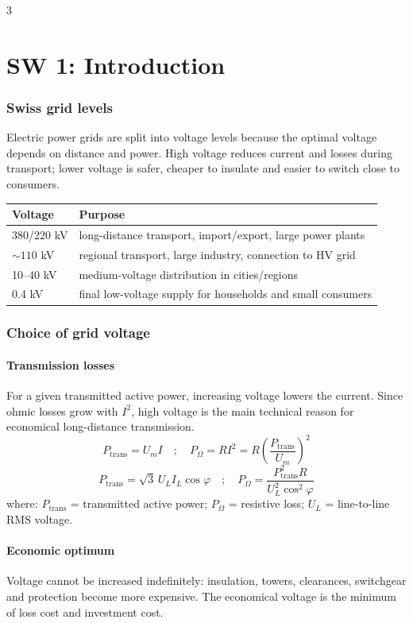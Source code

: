 \documentclass[9pt, landscape, a4paper]{article}
\begin{document}
\begin{multicols*}{3}
\part{SW 1: Introduction}
\section{Swiss grid levels}
Electric power grids are split into voltage levels because the optimal voltage
depends on distance and power. High voltage reduces current and losses during
transport; lower voltage is safer, cheaper to insulate and easier to switch
close to consumers.

\begin{tabularx}{\columnwidth}{@{}lX@{}}
  \toprule
  \textbf{Voltage} & \textbf{Purpose}\\
  \midrule
  380/220 kV & long-distance transport, import/export, large power plants\\
  $\sim110$ kV & regional transport, large industry, connection to HV grid\\
  10--40 kV & medium-voltage distribution in cities/regions\\
  0.4 kV & final low-voltage supply for households and small consumers\\
  \bottomrule
\end{tabularx}

\section{Choice of grid voltage}
\subsection{Transmission losses}
For a given transmitted active power, increasing voltage lowers the current.
Since ohmic losses grow with $I^2$, high voltage is the main technical reason
for economical long-distance transmission.
\[
  P_{\mathrm{trans}}=U_mI
  \quad ; \quad
  P_\Omega=RI^2
  =R\left(\frac{P_{\mathrm{trans}}}{U_m}\right)^2
\]
\[
  P_{\mathrm{trans}}=\sqrt{3}\,U_LI_L\cos\varphi
  \quad ; \quad
  P_\Omega=\frac{P_{\mathrm{trans}}^2R}
  {U_L^2\cos^2\varphi}
\]
where: $P_{\mathrm{trans}}$ = transmitted active power; $P_\Omega$ =
resistive loss; $U_L$ = line-to-line RMS voltage.

\subsection{Economic optimum}
Voltage cannot be increased indefinitely: insulation, towers, clearances,
switchgear and protection become more expensive. The economical voltage is the
minimum of loss cost and investment cost.


\end{multicols*}
\end{document}

